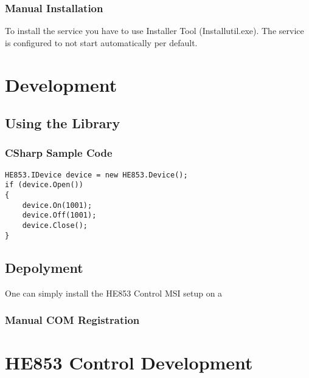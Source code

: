 \documentclass[
a4paper,
oneside,
halfparskip*,
normalheadings,
]
{scrbook}
\begin{document}
\subsection{Manual Installation}
To install the service you have to use Installer Tool (Installutil.exe). The service is
configured to not start automatically per default. 



\chapter{Development}

\section{Using the Library}

\subsection{CSharp Sample Code}
\begin{verbatim}
HE853.IDevice device = new HE853.Device();
if (device.Open())
{
    device.On(1001);
    device.Off(1001);
    device.Close();
}
\end{verbatim}



\section{Depolyment}
One can simply install the HE853 Control MSI setup on a 

\subsection{Manual COM Registration}

\chapter{HE853 Control Development}
\end{document}
